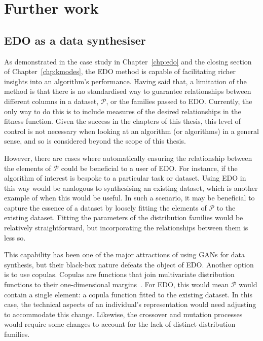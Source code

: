 \section{Further work}

\subsection*{EDO as a data synthesiser}

As demonstrated in the case study in Chapter~\ref{chp:edo} and the closing
section of Chapter~\ref{chp:kmodes}, the EDO method is capable of facilitating
richer insights into an algorithm's performance. Having said that, a limitation
of the method is that there is no standardised way to guarantee relationships
between different columns in a dataset, \(\mathcal P\), or the families passed
to EDO.  Currently, the only way to do this is to include measures of the
desired relationships in the fitness function. Given the success in the chapters
of this thesis, this level of control is not necessary when looking at an
algorithm (or algorithms) in a general sense, and so is considered beyond the
scope of this thesis.

However, there are cases where automatically ensuring the relationship between
the elements of \(\mathcal P\) could be beneficial to a user of EDO. For
instance, if the algorithm of interest is bespoke to a particular task or
dataset. Using EDO in this way would be analogous to synthesising an existing
dataset, which is another example of when this would be useful. In such a
scenario, it may be beneficial to capture the essence of a dataset by loosely
fitting the elements of \(\mathcal P\) to the existing dataset. Fitting the
parameters of the distribution families would be relatively straightforward, but
incorporating the relationships between them is less so.

This capability has been one of the major attractions of using GANs for data
synthesis, but their black-box nature defeats the object of EDO. Another option
is to use copulas. Copulas are functions that join multivariate distribution
functions to their one-dimensional margins~\cite{Nelsen1999}. For EDO, this
would mean \(\mathcal P\) would contain a single element: a copula function
fitted to the existing dataset. In this case, the technical aspects of an
individual's representation would need adjusting to accommodate this change.
Likewise, the crossover and mutation processes would require some changes to
account for the lack of distinct distribution families.

